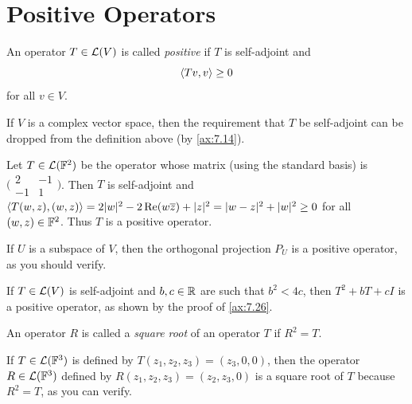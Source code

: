 \iftestbuild %
\setcounter{section}{2}\setcounter{theorem}{33}
\fi %
\DeclareRobustCommand\axeqno{\refstepcounter{theorem}\tag*{\thetheorem}}
\section{Positive Operators}

\begin{definition}\label{ax:7.34}
An operator $T\in\mathcal{L}(V)$ is called \emph{positive} if $T$ is self-adjoint and
\[ \langle Tv, v \rangle\ge0 \]
for all $v\in V$.
\end{definition}

If $V$ is a complex vector space, then the requirement that $T$ be self-adjoint
can be dropped from the definition above (by \ref{ax:7.14}).

\begin{example}\label{ax:7.35}\leavevmode
\begin{parts}
\item Let $T\in\mathcal{L}(\mathbb{F}^2)$ be the operator whose matrix (using the standard
  basis) is $\bigl(\begin{smallmatrix}2&-1\\-1&1\end{smallmatrix}\bigr)$. Then
  $T$ is self-adjoint and
  $\langle T(w,z), (w,z) \rangle=2\lvert w \rvert^2-2\operatorname{Re}(w\overline{z})+\lvert z \rvert^2
  =\lvert w-z \rvert^2+\lvert w \rvert^2\ge0$ for all $(w,z)\in\mathbb{F}^2$. Thus $T$ is a positive
  operator.
\item If $U$ is a subspace of $V$, then the orthogonal projection $P_U$ is a
  positive operator, as you should verify.
\item If $T\in\mathcal{L}(V)$ is self-adjoint and $b,c\in\mathbb{R}$ are such that $b^2<4c$,
  then $T^2+bT+cI$ is a positive operator, as shown by the proof of
  \ref{ax:7.26}.
\end{parts}
\end{example}

\begin{definition}\label{ax:7.36}
An operator $R$ is called a \emph{square root} of an operator $T$ if $R^2=T$.
\end{definition}

\begin{example}\label{ax:7.37}
If $T\in\mathcal{L}(\mathbb{F}^3)$ is defined by $T(z_1,z_2,z_3)=(z_3,0,0)$, then the operator
$R\in\mathcal{L}(\mathbb{F}^3)$ defined by $R(z_1,z_2,z_3)=(z_2,z_3,0)$ is a square root of $T$
because $R^2=T$, as you can verify.
\end{example}

